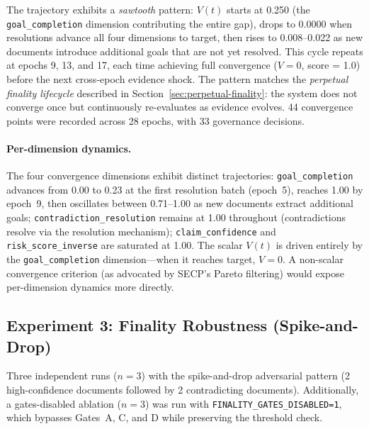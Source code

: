 \documentclass[11pt]{article}
\begin{document}
The trajectory exhibits a \emph{sawtooth} pattern: $V(t)$ starts at 0.250 (the \texttt{goal\_completion} dimension contributing the entire gap), drops to 0.0000 when resolutions advance all four dimensions to target, then rises to 0.008--0.022 as new documents introduce additional goals that are not yet resolved. This cycle repeats at epochs 9, 13, and 17, each time achieving full convergence ($V = 0$, score = 1.0) before the next cross-epoch evidence shock. The pattern matches the \emph{perpetual finality lifecycle} described in Section~\ref{sec:perpetual-finality}: the system does not converge once but continuously re-evaluates as evidence evolves. 44 convergence points were recorded across 28 epochs, with 33 governance decisions.

\paragraph{Per-dimension dynamics.} The four convergence dimensions exhibit distinct trajectories: \texttt{goal\_completion} advances from 0.00 to 0.23 at the first resolution batch (epoch~5), reaches 1.00 by epoch~9, then oscillates between 0.71--1.00 as new documents extract additional goals; \texttt{contradiction\_resolution} remains at 1.00 throughout (contradictions resolve via the resolution mechanism); \texttt{claim\_confidence} and \texttt{risk\_score\_inverse} are saturated at 1.00. The scalar $V(t)$ is driven entirely by the \texttt{goal\_completion} dimension---when it reaches target, $V = 0$. A non-scalar convergence criterion (as advocated by SECP's Pareto filtering) would expose per-dimension dynamics more directly.

\subsection{Experiment 3: Finality Robustness (Spike-and-Drop)}

Three independent runs ($n = 3$) with the spike-and-drop adversarial pattern (2 high-confidence documents followed by 2 contradicting documents). Additionally, a gates-disabled ablation ($n = 3$) was run with \texttt{FINALITY\_GATES\_DISABLED=1}, which bypasses Gates~A, C, and D while preserving the threshold check.
\end{document}
